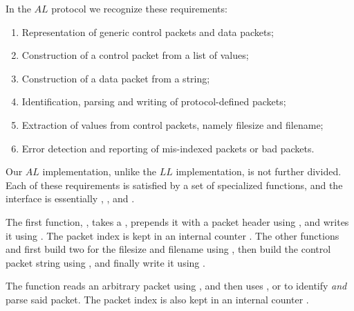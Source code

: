 \documentclass[main.tex]{subfiles}
\begin{document}
In the $AL$ protocol we recognize these requirements:

\begin{enumerate}[label=(\alph*),noitemsep,rightmargin=3em]
	\item Representation of generic control packets and data packets;
	\item Construction of a control packet from a list of values;
	\item Construction of a data packet from a string;
	\item Identification, parsing and writing of protocol-defined packets;
	\item Extraction of  values from control packets, namely filesize and filename;
	\item Error detection and reporting of mis-indexed \pDATA{} packets or bad packets.
\end{enumerate}

Our $AL$ implementation, unlike the $LL$ implementation, is not further divided. Each of these requirements is satisfied by a set of specialized functions, and the interface is essentially , ,  and .

The first function, , takes a , prepends it with a packet header using , and writes it using . The packet index is kept in an internal counter . The other functions  and  first build two  for the filesize and filename using , then build the control packet string using , and finally write it using .

The  function reads an arbitrary packet using , and then uses ,  or  to identify \emph{and} parse said packet. The packet index is also kept in an internal counter .
\end{document}
